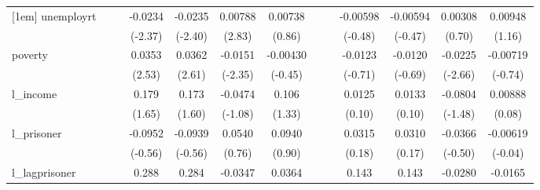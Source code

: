 {\begin{tabular}{l*{12}{c}}
[1em]
unemployrt  &                     &                     &     -0.0234\sym{*}  &     -0.0235\sym{*}  &     0.00788\sym{**} &     0.00738         &                     &                     &    -0.00598         &    -0.00594         &     0.00308         &     0.00948         \\
            &                     &                     &     (-2.37)         &     (-2.40)         &      (2.83)         &      (0.86)         &                     &                     &     (-0.48)         &     (-0.47)         &      (0.70)         &      (1.16)         \\
[1em]
poverty     &                     &                     &      0.0353\sym{*}  &      0.0362\sym{*}  &     -0.0151\sym{*}  &    -0.00430         &                     &                     &     -0.0123         &     -0.0120         &     -0.0225\sym{*}  &    -0.00719         \\
            &                     &                     &      (2.53)         &      (2.61)         &     (-2.35)         &     (-0.45)         &                     &                     &     (-0.71)         &     (-0.69)         &     (-2.66)         &     (-0.74)         \\
[1em]
l\_income    &                     &                     &       0.179         &       0.173         &     -0.0474         &       0.106         &                     &                     &      0.0125         &      0.0133         &     -0.0804         &     0.00888         \\
            &                     &                     &      (1.65)         &      (1.60)         &     (-1.08)         &      (1.33)         &                     &                     &      (0.10)         &      (0.10)         &     (-1.48)         &      (0.08)         \\
[1em]
l\_prisoner  &                     &                     &     -0.0952         &     -0.0939         &      0.0540         &      0.0940         &                     &                     &      0.0315         &      0.0310         &     -0.0366         &    -0.00619         \\
            &                     &                     &     (-0.56)         &     (-0.56)         &      (0.76)         &      (0.90)         &                     &                     &      (0.18)         &      (0.17)         &     (-0.50)         &     (-0.04)         \\
[1em]
l\_lagprisoner&                     &                     &       0.288         &       0.284         &     -0.0347         &      0.0364         &                     &                     &       0.143         &       0.143         &     -0.0280         &     -0.0165         \\

\end{tabular}}
